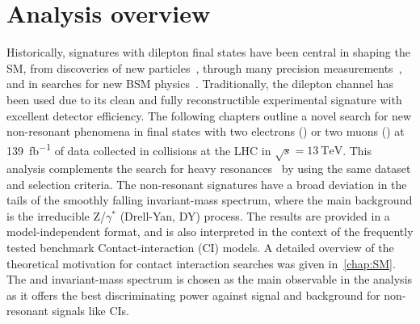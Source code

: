 \chapter*{Analysis overview}\label{chap:analyintro}


Historically, signatures with dilepton final states have been central in shaping the SM, from discoveries of new particles~\cite{PhysRevLett.33.1404, PhysRevLett.33.1406,1977PhRvL..39..252H,1983398,BAGNAIA1983130}, through many precision measurements~\cite{ALEPH:2005ab,Aad:2016zzw,Aad:2016izn,Sirunyan:2018swq}, and in searches for new BSM physics~\cite{Aad:2019fac,Sirunyan:2018exx,Sirunyan:2018ipj,EXOT-2016-05}. Traditionally, the dilepton channel has been used due to its clean and fully reconstructible experimental signature with excellent detector efficiency. The following chapters outline a novel search for new non-resonant phenomena in final states with two electrons (\ee) or two muons (\mumu) at \SI{139}{\femto\barn^{-1}} of data collected in \protonproton collisions at the LHC in $\sqrt{s}=\SI{13}{\tera\electronvolt}$. This analysis complements the search for heavy resonances~\cite{Aad:2019fac} by using the same dataset and selection criteria. The non-resonant signatures have a broad deviation in the tails of the smoothly falling invariant-mass spectrum, where the main background is the irreducible Z/$\gamma^*$ (Drell-Yan, DY) process. The results are provided in a model-independent format, and is also interpreted in the context of the frequently tested benchmark Contact-interaction (CI) models. A detailed overview of the theoretical motivation for contact interaction searches was given in~\cref{chap:SM}. The \ee and \mumu invariant-mass spectrum is chosen as the main observable in the analysis as it offers the best discriminating power against signal and background for non-resonant signals like CIs. 

